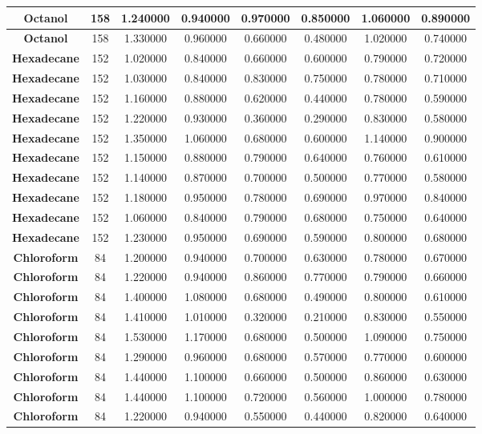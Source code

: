 \documentclass{amsart}
\begin{document}
\begin{center}
\begin{tabular}{c|c|c|c|c|c|c|c}
\textbf{Octanol}&158&1.240000&0.940000&0.970000&0.850000&1.060000&0.890000 \\ \hline 
\textbf{Octanol}&158&1.330000&0.960000&0.660000&0.480000&1.020000&0.740000 \\ \hline 
\textbf{Hexadecane}&152&1.020000&0.840000&0.660000&0.600000&0.790000&0.720000 \\ \hline 
\textbf{Hexadecane}&152&1.030000&0.840000&0.830000&0.750000&0.780000&0.710000 \\ \hline 
\textbf{Hexadecane}&152&1.160000&0.880000&0.620000&0.440000&0.780000&0.590000 \\ \hline 
\textbf{Hexadecane}&152&1.220000&0.930000&0.360000&0.290000&0.830000&0.580000 \\ \hline 
\textbf{Hexadecane}&152&1.350000&1.060000&0.680000&0.600000&1.140000&0.900000 \\ \hline 
\textbf{Hexadecane}&152&1.150000&0.880000&0.790000&0.640000&0.760000&0.610000 \\ \hline 
\textbf{Hexadecane}&152&1.140000&0.870000&0.700000&0.500000&0.770000&0.580000 \\ \hline 
\textbf{Hexadecane}&152&1.180000&0.950000&0.780000&0.690000&0.970000&0.840000 \\ \hline 
\textbf{Hexadecane}&152&1.060000&0.840000&0.790000&0.680000&0.750000&0.640000 \\ \hline 
\textbf{Hexadecane}&152&1.230000&0.950000&0.690000&0.590000&0.800000&0.680000 \\ \hline 
\textbf{Chloroform}& 84&1.200000&0.940000&0.700000&0.630000&0.780000&0.670000 \\ \hline 
\textbf{Chloroform}& 84&1.220000&0.940000&0.860000&0.770000&0.790000&0.660000 \\ \hline 
\textbf{Chloroform}& 84&1.400000&1.080000&0.680000&0.490000&0.800000&0.610000 \\ \hline 
\textbf{Chloroform}& 84&1.410000&1.010000&0.320000&0.210000&0.830000&0.550000 \\ \hline 
\textbf{Chloroform}& 84&1.530000&1.170000&0.680000&0.500000&1.090000&0.750000 \\ \hline 
\textbf{Chloroform}& 84&1.290000&0.960000&0.680000&0.570000&0.770000&0.600000 \\ \hline 
\textbf{Chloroform}& 84&1.440000&1.100000&0.660000&0.500000&0.860000&0.630000 \\ \hline 
\textbf{Chloroform}& 84&1.440000&1.100000&0.720000&0.560000&1.000000&0.780000 \\ \hline 
\textbf{Chloroform}& 84&1.220000&0.940000&0.550000&0.440000&0.820000&0.640000 \\ \hline 

\end{tabular}
\end{center}
\end{document}
